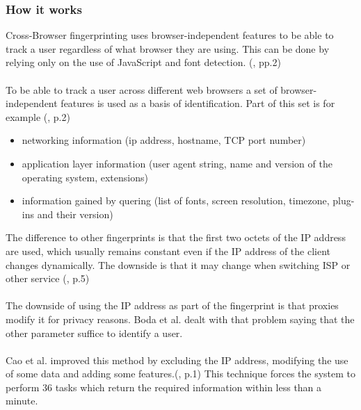 \subsubsection{How it works}
Cross-Browser fingerprinting uses browser-independent features to be able to track a user regardless of what browser they are using. This can be done by relying only on the use of JavaScript and font detection. (\textcite{upi15}, pp.2)\\\\
To be able to track a user across different web browsers a set of browser-independent features is used as a basis of identification. Part of this set is for example (\textcite{boda11}, p.2)
\begin{itemize}
	\item networking information (ip address, hostname, TCP port number)
	\item application layer information (user agent string, name and version of the operating system, extensions)
	\item information gained by quering (list of fonts, screen resolution, timezone, plug-ins and their version)\\
\end{itemize}
The difference to other fingerprints is that the first two octets of the IP address are used, which usually remains constant even if the IP address of the client changes dynamically. The downside is that it may change when switching ISP or other service (\textcite{boda11}, p.5)\\\\
The downside of using the IP address as part of the fingerprint is that proxies modify it for privacy reasons. Boda et al. dealt with that problem saying that the other parameter suffice to identify a user.\\\\
Cao et al. improved this method by excluding the IP address, modifying the use of some data and adding some features.(\textcite{Cao17}, p.1) This technique forces the system to perform 36 tasks which return the required information within less than a minute.\\\\
